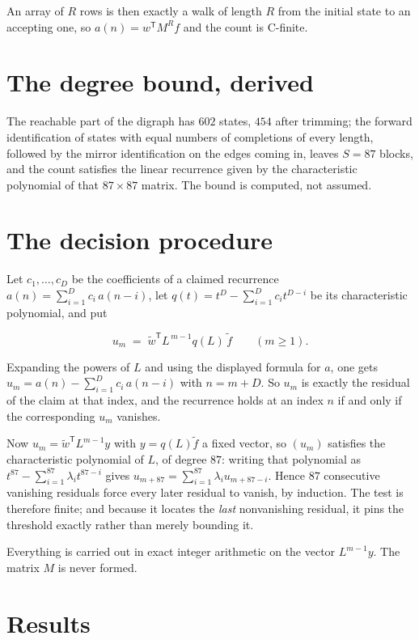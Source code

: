 \documentclass[11pt]{article}
\theoremstyle{definition}
\begin{document}
An array of $R$ rows is then exactly a walk of length $R$ from the initial state to an accepting one, so $a(n) = w^{\mathsf T}M^{R}f$ and the count is C-finite.

\section{The degree bound, derived}

The reachable part of the digraph has $602$ states, $454$ after trimming; the forward identification of states with equal numbers of completions of every length, followed by the mirror identification on the edges coming in, leaves $S = 87$ blocks, and the count satisfies the linear recurrence given by the characteristic polynomial of that $87\times87$ matrix. The bound is computed, not assumed.

\section{The decision procedure}

Let $c_1,\dots,c_D$ be the coefficients of a claimed recurrence $a(n) = \sum_{i=1}^{D} c_i\,a(n-i)$, let $q(t) = t^{D} - \sum_{i=1}^{D} c_i t^{D-i}$ be its characteristic polynomial, and put

\[u_m \;=\; \tilde w^{\mathsf T} L^{\,m-1} q(L)\,\tilde f \qquad (m \ge 1).\]

Expanding the powers of $L$ and using the displayed formula for $a$, one gets $u_m = a(n) - \sum_{i=1}^{D} c_i\,a(n-i)$ with $n = m + D$. So $u_m$ is exactly the residual of the claim at that index, and the recurrence holds at an index $n$ if and only if the corresponding $u_m$ vanishes.

Now $u_m = \tilde w^{\mathsf T} L^{m-1} y$ with $y = q(L)\tilde f$ a fixed vector, so $(u_m)$ satisfies the characteristic polynomial of $L$, of degree $87$: writing that polynomial as $t^{87} - \sum_{i=1}^{87} \lambda_i t^{87-i}$ gives $u_{m+87} = \sum_{i=1}^{87} \lambda_i u_{m+87-i}$. Hence $87$ consecutive vanishing residuals force every later residual to vanish, by induction. The test is therefore finite; and because it locates the {\itshape last} nonvanishing residual, it pins the threshold exactly rather than merely bounding it.

Everything is carried out in exact integer arithmetic on the vector $L^{m-1}y$. The matrix $M$ is never formed.

\section{Results}
\end{document}
